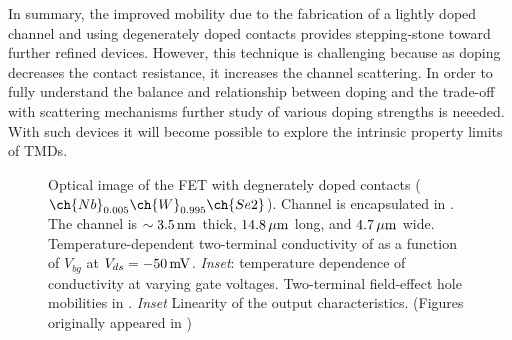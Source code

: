 \noindent In summary, the improved mobility due to the fabrication of a lightly doped channel and using degenerately doped contacts provides stepping-stone toward further refined devices. However, this technique is challenging because as doping decreases the contact resistance, it increases the channel scattering. In order to fully understand the balance and relationship between doping and the trade-off with scattering mechanisms further study of various doping strengths is neeeded. With such devices it will become possible to explore the intrinsic property limits of \acp{TMD}.
\begin{figure}[ht]
	\centering
	\caption[Undoped  channel with $\ch{Nb}_{0.005}\ch{W}_{0.995}\ch{Se2}$ contacts]{\protect{} Optical image of the  FET with degnerately doped contacts ($\ch{Nb}_{0.005}\ch{W}_{0.995}\ch{Se2}$). Channel  is encapsulated in \hbn. The  channel is $\sim 3.5\,\mathrm{nm}$ thick, $14.8\,\mathrm{\mu m}$ long, and $4.7\,\mathrm{\mu m}$ wide. \protect{} Temperature-dependent two-terminal conductivity of  as a function of $V_{bg}$ at $V_{ds}=-50\,\mathrm{mV}$. \emph{Inset}: temperature dependence of conductivity at varying gate voltages. \protect{} Two-terminal field-effect hole mobilities in . \emph{Inset} Linearity of the output characteristics. (Figures originally appeared in \cite{Chuang_2016})}
	\label{fig:ben_mu_fe_data}
\end{figure}